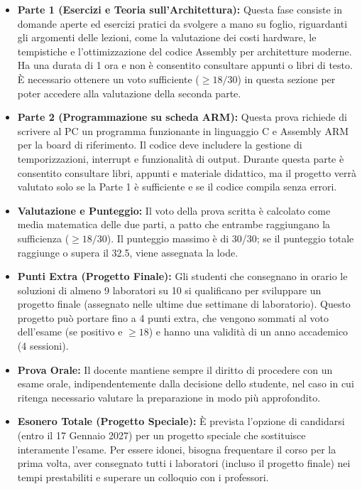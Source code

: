 \begin{itemize}
    \item \textbf{Parte 1 (Esercizi e Teoria sull'Architettura):} Questa fase consiste in domande aperte ed esercizi pratici da svolgere a mano su foglio, riguardanti gli argomenti delle lezioni, come la valutazione dei costi hardware, le tempistiche e l'ottimizzazione del codice Assembly per architetture moderne. Ha una durata di 1 ora e non è consentito consultare appunti o libri di testo. È necessario ottenere un voto sufficiente ($\geq 18/30$) in questa sezione per poter accedere alla valutazione della seconda parte.
    
    \item \textbf{Parte 2 (Programmazione su scheda ARM):} Questa prova richiede di scrivere al PC un programma funzionante in linguaggio C e Assembly ARM per la board di riferimento. Il codice deve includere la gestione di temporizzazioni, interrupt e funzionalità di output. Durante questa parte è consentito consultare libri, appunti e materiale didattico, ma il progetto verrà valutato solo se la Parte 1 è sufficiente e se il codice compila senza errori.
    
    \item \textbf{Valutazione e Punteggio:} Il voto della prova scritta è calcolato come media matematica delle due parti, a patto che entrambe raggiungano la sufficienza ($\geq 18/30$). Il punteggio massimo è di 30/30; se il punteggio totale raggiunge o supera il 32.5, viene assegnata la lode.
    
    \item \textbf{Punti Extra (Progetto Finale):} Gli studenti che consegnano in orario le soluzioni di almeno 9 laboratori su 10 si qualificano per sviluppare un progetto finale (assegnato nelle ultime due settimane di laboratorio). Questo progetto può portare fino a 4 punti extra, che vengono sommati al voto dell'esame (se positivo e $\geq 18$) e hanno una validità di un anno accademico (4 sessioni).
    
    \item \textbf{Prova Orale:} Il docente mantiene sempre il diritto di procedere con un esame orale, indipendentemente dalla decisione dello studente, nel caso in cui ritenga necessario valutare la preparazione in modo più approfondito.
    
    \item \textbf{Esonero Totale (Progetto Speciale):} È prevista l'opzione di candidarsi (entro il 17 Gennaio 2027) per un progetto speciale che sostituisce interamente l'esame. Per essere idonei, bisogna frequentare il corso per la prima volta, aver consegnato tutti i laboratori (incluso il progetto finale) nei tempi prestabiliti e superare un colloquio con i professori.
\end{itemize}
